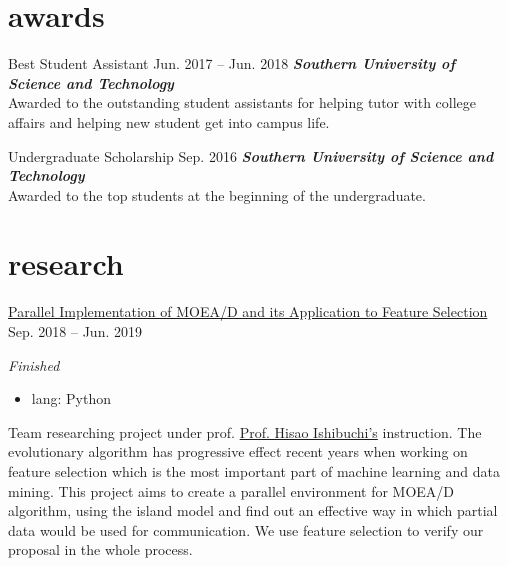 \documentclass[hidelinks__VERSION__]{adamyi-cv}
\begin{document}

\section{awards}

\begin{entrylist}


\entry
{Best Student Assistant}
{Jun. 2017 -- Jun. 2018}
{\emph{\textbf{Southern University of Science and Technology}}\\
Awarded to the outstanding student assistants for helping tutor with college affairs and helping new student get into campus life.
}


\entry
{Undergraduate Scholarship}
{Sep. 2016}
{\emph{\textbf{Southern University of Science and Technology}}\\
Awarded to the top students at the beginning of the undergraduate.
}


\end{entrylist}


\section{research}

\begin{entrylist}


\entry
{\href{https://github.com/hackroid/pMOEA-D}{Parallel Implementation of MOEA/D and its Application to Feature Selection}}
{Sep. 2018 -- Jun. 2019}
{\emph{Finished}
\begin{itemize}
    \item lang: Python
\end{itemize}
Team researching project under prof. \href{http://cse.sustech.edu.cn/en/people/view/people_id/55/sort_id/9/pid/}{Prof. Hisao Ishibuchi's} instruction. The evolutionary algorithm has progressive effect recent years when working on feature selection which is the most important part of machine learning and data mining. This project aims to create a parallel environment for MOEA/D algorithm, using the island model and find out an effective way in which partial data would be used for communication. We use feature selection to verify our proposal in the whole process.
}


\end{entrylist}
\end{document}
